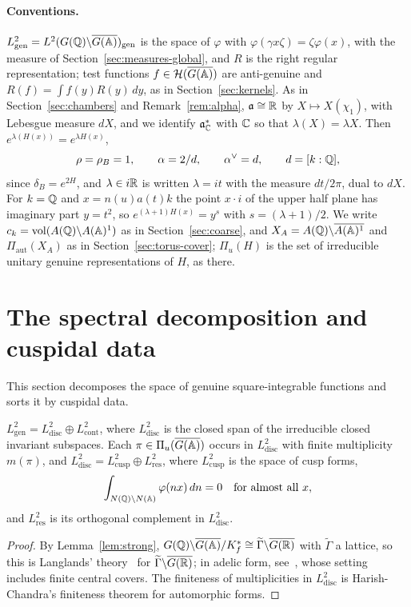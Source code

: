 \paragraph{Conventions.} $L^2_{\mathrm{gen}}=L^2(G(\mathbb{Q})\backslash\overline{G(\mathbb{A})})_
{\mathrm{gen}}$ is the space of $\varphi$ with $\varphi(\gamma x\zeta)=
\zeta\varphi(x)$, with the measure of
Section~\ref{sec:measures-global}, and $R$ is the right regular representation; test functions
$f\in\mathcal H(\overline{G(\mathbb{A})})$ are anti-genuine and $R(f)=\int f(y)R(y)\,dy$, as in
Section~\ref{sec:kernels}. As in Section~\ref{sec:chambers} and
Remark~\ref{rem:alpha}, $\mathfrak a\cong\mathbb{R}$ by $X\mapsto X(\chi_1)$, with
Lebesgue measure $dX$, and we identify $\mathfrak a^*_{\mathbb{C}}$ with $\mathbb{C}$ so that
$\lambda(X)=\lambda X$. Then $e^{\lambda(H(x))}=e^{\lambda H(x)}$,
\[
\rho=\rho_B=1,\qquad\alpha=2/d,\qquad\alpha^\vee=d,\qquad d=[k:\mathbb{Q}],
\]
since $\delta_B=e^{2H}$, and $\lambda\in i\mathbb{R}$ is written $\lambda=it$ with
the measure $dt/2\pi$, dual to $dX$. For $k=\mathbb{Q}$ and $x=n(u)a(t)k$ the
point $x\cdot i$ of the upper half plane has imaginary part $y=t^2$, so
$e^{(\lambda+1)H(x)}=y^{s}$ with $s=(\lambda+1)/2$. We write $c_k=
\operatorname{vol}(A(\mathbb{Q})\backslash A(\mathbb{A})^1)$ as in Section~\ref{sec:coarse}, and
$X_A=A(\mathbb{Q})\backslash\overline{A(\mathbb{A})^1}$ and $\Pi_{\mathrm{aut}}(X_A)$ as
in Section~\ref{sec:torus-cover}; $\Pi_u(H)$ is the set of irreducible
unitary genuine representations of $H$, as there.

\section{The spectral decomposition and cuspidal data}\label{sec:decomp}

This section decomposes the space of genuine square-integrable
functions and sorts it by cuspidal data.


\begin{lemma}\label{lem:spec-decomp}
$L^2_{\mathrm{gen}}=L^2_{\mathrm{disc}}\oplus L^2_{\mathrm{cont}}$, where
$L^2_{\mathrm{disc}}$ is the closed span of the irreducible closed
invariant subspaces. Each $\pi\in\Pi_u(\overline{G(\mathbb{A})})$ occurs in
$L^2_{\mathrm{disc}}$ with finite multiplicity $m(\pi)$, and
$L^2_{\mathrm{disc}}=L^2_{\mathrm{cusp}}\oplus L^2_{\mathrm{res}}$, where
$L^2_{\mathrm{cusp}}$ is the space of cusp forms,
\[
\int_{N(\mathbb{Q})\backslash N(\mathbb{A})}\varphi(nx)\,dn=0\quad\text{for almost all }x,
\]
and $L^2_{\mathrm{res}}$ is its orthogonal complement in
$L^2_{\mathrm{disc}}$.
\end{lemma}

\begin{proof}
By Lemma~\ref{lem:strong}, $G(\mathbb{Q})\backslash\overline{G(\mathbb{A})}/K_f^*\cong
\widetilde\Gamma\backslash\overline{G(\mathbb{R})}$ with $\widetilde\Gamma$ a
lattice, so this is Langlands' theory~\cite{La76} for
$\widetilde\Gamma\backslash\overline{G(\mathbb{R})}$; in adelic form,
see~\cite{MW95}, whose setting includes finite central covers. The finiteness of multiplicities in
$L^2_{\mathrm{disc}}$ is Harish-Chandra's finiteness theorem for
automorphic forms.
\end{proof}

